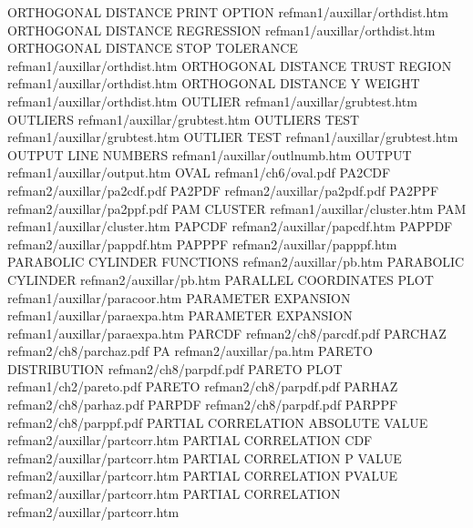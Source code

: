ORTHOGONAL DISTANCE PRINT OPTION        refman1/auxillar/orthdist.htm
ORTHOGONAL DISTANCE REGRESSION          refman1/auxillar/orthdist.htm
ORTHOGONAL DISTANCE STOP TOLERANCE      refman1/auxillar/orthdist.htm
ORTHOGONAL DISTANCE TRUST REGION        refman1/auxillar/orthdist.htm
ORTHOGONAL DISTANCE Y WEIGHT            refman1/auxillar/orthdist.htm
OUTLIER                                 refman1/auxillar/grubtest.htm
OUTLIERS                                refman1/auxillar/grubtest.htm
OUTLIERS TEST                           refman1/auxillar/grubtest.htm
OUTLIER TEST                            refman1/auxillar/grubtest.htm
OUTPUT LINE NUMBERS                     refman1/auxillar/outlnumb.htm
OUTPUT                                  refman1/auxillar/output.htm
OVAL                                    refman1/ch6/oval.pdf
PA2CDF                                  refman2/auxillar/pa2cdf.pdf
PA2PDF                                  refman2/auxillar/pa2pdf.pdf
PA2PPF                                  refman2/auxillar/pa2ppf.pdf
PAM CLUSTER                             refman1/auxillar/cluster.htm
PAM                                     refman1/auxillar/cluster.htm
PAPCDF                                  refman2/auxillar/papcdf.htm
PAPPDF                                  refman2/auxillar/pappdf.htm
PAPPPF                                  refman2/auxillar/papppf.htm
PARABOLIC CYLINDER FUNCTIONS            refman2/auxillar/pb.htm
PARABOLIC CYLINDER                      refman2/auxillar/pb.htm
PARALLEL COORDINATES PLOT               refman1/auxillar/paracoor.htm
PARAMETER EXPANSION                     refman1/auxillar/paraexpa.htm
PARAMETER EXPANSION                     refman1/auxillar/paraexpa.htm
PARCDF                                  refman2/ch8/parcdf.pdf
PARCHAZ                                 refman2/ch8/parchaz.pdf
PA                                      refman2/auxillar/pa.htm
PARETO DISTRIBUTION                     refman2/ch8/parpdf.pdf
PARETO PLOT                             refman1/ch2/pareto.pdf
PARETO                                  refman2/ch8/parpdf.pdf
PARHAZ                                  refman2/ch8/parhaz.pdf
PARPDF                                  refman2/ch8/parpdf.pdf
PARPPF                                  refman2/ch8/parppf.pdf
PARTIAL CORRELATION ABSOLUTE VALUE      refman2/auxillar/partcorr.htm
PARTIAL CORRELATION CDF                 refman2/auxillar/partcorr.htm
PARTIAL CORRELATION P VALUE             refman2/auxillar/partcorr.htm
PARTIAL CORRELATION PVALUE              refman2/auxillar/partcorr.htm
PARTIAL CORRELATION                     refman2/auxillar/partcorr.htm
